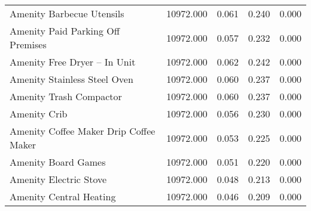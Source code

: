 \begin{tabular}{lllll}
Amenity Barbecue Utensils & 10972.000 & 0.061 & 0.240 & 0.000 \\
Amenity Paid Parking Off Premises & 10972.000 & 0.057 & 0.232 & 0.000 \\
Amenity Free Dryer – In Unit & 10972.000 & 0.062 & 0.242 & 0.000 \\
Amenity Stainless Steel Oven & 10972.000 & 0.060 & 0.237 & 0.000 \\
Amenity Trash Compactor & 10972.000 & 0.060 & 0.237 & 0.000 \\
Amenity Crib & 10972.000 & 0.056 & 0.230 & 0.000 \\
Amenity Coffee Maker Drip Coffee Maker & 10972.000 & 0.053 & 0.225 & 0.000 \\
Amenity Board Games & 10972.000 & 0.051 & 0.220 & 0.000 \\
Amenity Electric Stove & 10972.000 & 0.048 & 0.213 & 0.000 \\
Amenity Central Heating & 10972.000 & 0.046 & 0.209 & 0.000 \\
\bottomrule
\end{tabular}
